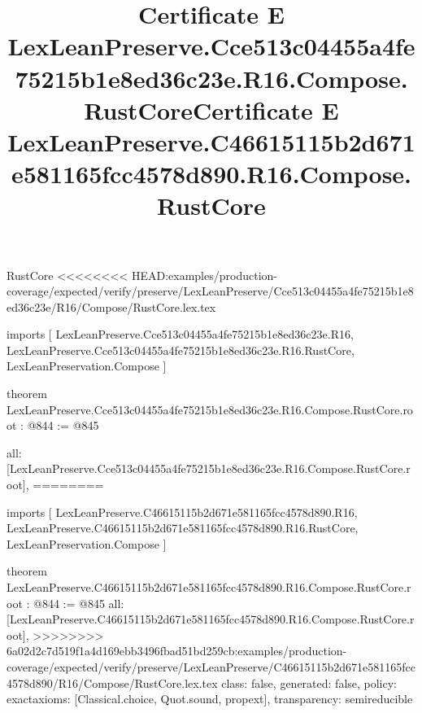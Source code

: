 \begin{lexlean}{RustCore}
<<<<<<<< HEAD:examples/production-coverage/expected/verify/preserve/LexLeanPreserve/Cce513c04455a4fe75215b1e8ed36c23e/R16/Compose/RustCore.lex.tex
\title{Certificate E LexLeanPreserve.Cce513c04455a4fe75215b1e8ed36c23e.R16.Compose.RustCore}
\begin{coremodule}
imports [
  LexLeanPreserve.Cce513c04455a4fe75215b1e8ed36c23e.R16,
  LexLeanPreserve.Cce513c04455a4fe75215b1e8ed36c23e.R16.RustCore,
  LexLeanPreservation.Compose
]

theorem LexLeanPreserve.Cce513c04455a4fe75215b1e8ed36c23e.R16.Compose.RustCore.root : @844 := @845 {
  all: [LexLeanPreserve.Cce513c04455a4fe75215b1e8ed36c23e.R16.Compose.RustCore.root],
========
\title{Certificate E LexLeanPreserve.C46615115b2d671e581165fcc4578d890.R16.Compose.RustCore}
\begin{coremodule}
imports [
  LexLeanPreserve.C46615115b2d671e581165fcc4578d890.R16,
  LexLeanPreserve.C46615115b2d671e581165fcc4578d890.R16.RustCore,
  LexLeanPreservation.Compose
]

theorem LexLeanPreserve.C46615115b2d671e581165fcc4578d890.R16.Compose.RustCore.root : @844 := @845 {
  all: [LexLeanPreserve.C46615115b2d671e581165fcc4578d890.R16.Compose.RustCore.root],
>>>>>>>> 6a02d2c7d519f1a4d169ebb3496fbad51bd259cb:examples/production-coverage/expected/verify/preserve/LexLeanPreserve/C46615115b2d671e581165fcc4578d890/R16/Compose/RustCore.lex.tex
  class: false,
  generated: false,
  policy: exact{axioms: [Classical.choice, Quot.sound, propext]},
  transparency: semireducible
}


\end{coremodule}}
\end{coremodule}
\end{lexlean}
